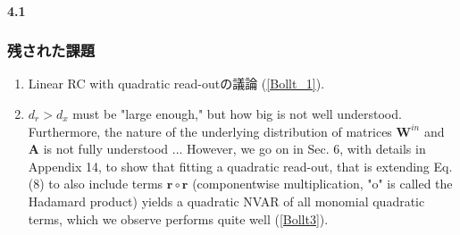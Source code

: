 \paragraph{4.1}

\subsubsection{残された課題}
\label{Bollts_problems}
\begin{enumerate}
    \item Linear RC with quadratic read-outの議論 (\ref{Bollt_1}).
    \item $d_r>d_x$ must be "large enough," but how big is not well understood. Furthermore, the nature of the underlying distribution of matrices $\mathbf{W}^{i n}$ and $\mathbf{A}$ is not fully understood ... However, we go on in Sec. 6, with details in Appendix 14, to show that fitting a quadratic read-out, that is extending Eq. (8) to also include terms $\mathbf{r} \circ \mathbf{r}$ (componentwise multiplication, "o" is called the Hadamard product) yields a quadratic NVAR of all monomial quadratic terms, which we observe performs quite well (\ref{Bollt3}).
\end{enumerate}
\clearpage

